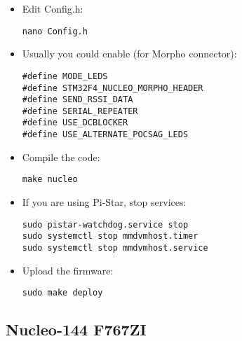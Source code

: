 \documentclass[]{article}
\begin{document}
\begin{itemize}[leftmargin=*]
\item Edit Config.h:

\begin{lstlisting}[style=DOS]
nano Config.h
\end{lstlisting}

\item Usually you could enable (for Morpho connector):

\begin{verbatim}
#define MODE_LEDS
#define STM32F4_NUCLEO_MORPHO_HEADER
#define SEND_RSSI_DATA
#define SERIAL_REPEATER
#define USE_DCBLOCKER
#define USE_ALTERNATE_POCSAG_LEDS
\end{verbatim}

\item Compile the code:

\begin{lstlisting}[style=DOS]
make nucleo
\end{lstlisting}

\item If you are using Pi-Star, stop services:

\begin{lstlisting}[style=DOS]
sudo pistar-watchdog.service stop
sudo systemctl stop mmdvmhost.timer
sudo systemctl stop mmdvmhost.service
\end{lstlisting}

\item Upload the firmware:

\begin{lstlisting}[style=DOS]
sudo make deploy
\end{lstlisting}

\end{itemize}

\subsection{Nucleo-144 F767ZI}
\end{document}
